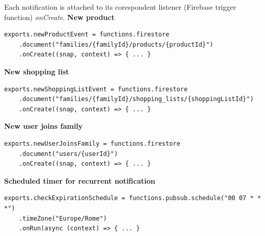 Each notification is attached to its corespondent listener (Firebase trigger function) \textit{onCreate}.
\newline
\newline
\noindent\textbf{New product}
\begin{lstlisting}[caption=My Javascript Example]
exports.newProductEvent = functions.firestore
    .document("families/{familyId}/products/{productId}")
    .onCreate((snap, context) => { ... }
\end{lstlisting}
\newline
\noindent\textbf{New shopping list}
\begin{lstlisting}[caption=My Javascript Example]
exports.newShoppingListEvent = functions.firestore
    .document("families/{familyId}/shopping_lists/{shoppingListId}")
    .onCreate((snap, context) => { ... }
\end{lstlisting}
\newline
\noindent\textbf{New user joins family}
\begin{lstlisting}[caption=My Javascript Example]
exports.newUserJoinsFamily = functions.firestore
    .document("users/{userId}")
    .onCreate((snap, context) => { ... }
\end{lstlisting}

\newline
\noindent\textbf{Scheduled timer for recurrent notification}
\begin{lstlisting}[caption=My Javascript Example]
exports.checkExpirationSchedule = functions.pubsub.schedule("00 07 * * *")
    .timeZone("Europe/Rome")
    .onRun(async (context) => { ... }
\end{lstlisting}